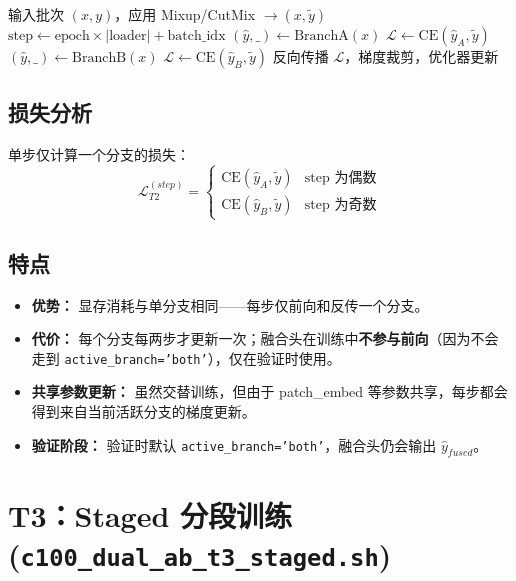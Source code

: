 \documentclass[a4paper,11pt]{article}
\begin{document}
\begin{algorithm}[h]
\caption{T2 Alternate 交替训练 — 单个 Step}
\begin{algorithmic}[1]
\STATE 输入批次 $(x, y)$，应用 Mixup/CutMix $\rightarrow (x, \tilde{y})$
\STATE $\text{step} \leftarrow \text{epoch} \times |\text{loader}| + \text{batch\_idx}$
    \STATE $(\hat{y}, \_) \leftarrow \text{BranchA}(x)$
    \STATE $\mathcal{L} \leftarrow \text{CE}(\hat{y}_A, \tilde{y})$
\ELSE
    \STATE $(\hat{y}, \_) \leftarrow \text{BranchB}(x)$
    \STATE $\mathcal{L} \leftarrow \text{CE}(\hat{y}_B, \tilde{y})$
\ENDIF
\STATE 反向传播 $\mathcal{L}$，梯度裁剪，优化器更新
\end{algorithmic}
\end{algorithm}

\subsection{损失分析}

单步仅计算一个分支的损失：
\[
    \mathcal{L}_{T2}^{(step)} = \begin{cases}
        \text{CE}(\hat{y}_A, \tilde{y}) & \text{step 为偶数} \\
        \text{CE}(\hat{y}_B, \tilde{y}) & \text{step 为奇数}
    \end{cases}
\]

\subsection{特点}

\begin{itemize}
    \item \textbf{优势：} 显存消耗与单分支相同——每步仅前向和反传一个分支。
    \item \textbf{代价：} 每个分支每两步才更新一次；融合头在训练中\textbf{不参与前向}（因为不会走到 \texttt{active\_branch='both'}），仅在验证时使用。
    \item \textbf{共享参数更新：} 虽然交替训练，但由于 patch\_embed 等参数共享，每步都会得到来自当前活跃分支的梯度更新。
    \item \textbf{验证阶段：} 验证时默认 \texttt{active\_branch='both'}，融合头仍会输出 $\hat{y}_{fused}$。
\end{itemize}

\section{T3：Staged 分段训练 (\texttt{c100\_dual\_ab\_t3\_staged.sh})}
\end{document}
